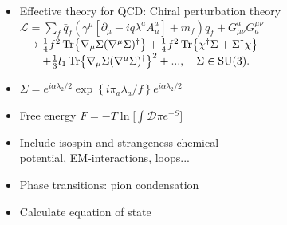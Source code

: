 \documentclass[aspectratio=169]{beamer}
\begin{document}
\begin{frame}
        \begin{itemize}
            \itemsep 0.4cm
            \item Effective theory for QCD: Chiral perturbation theory\\
            $
            \mathcal L = 
            \sum_f \bar q_f (\gamma^\mu [\partial_\mu - i q     \lambda^a A^a_\mu ] + m_f)q_f
            + G^a_{\mu \nu} G_a^{\mu \nu}
            $ \\
            $
            \longrightarrow
            \frac{1}{4} f^2 \Tr{\nabla_\mu \Sigma (\nabla^\mu \Sigma)^\dagger}
            + \frac{1}{4} f^2 \Tr{\chi^\dagger \Sigma + \Sigma^\dagger \chi} 
            $\\
            $
            \quad\quad + \frac{1}{3} l_1 \Tr{\nabla_\mu \Sigma (\nabla^\mu \Sigma)^\dagger}^2+
            ..., \quad
            \Sigma \in \text{SU}(3).
            $
            \item $\Sigma 
            = e^{i\alpha \lambda_2/2}\exp\left\{i \pi_a \lambda_a / f\right\}e^{i\alpha \lambda_2/2}
            $
            \item Free energy
            $
            F = - T
            \ln\Big[\int \mathcal{D}\pi e^{-S}\Big]
            $
            \item Include isospin and strangeness chemical \\
            potential, EM-interactions, loops...
            \item Phase transitions: pion condensation
            \item Calculate equation of state
        \end{itemize}


    \end{frame}
\end{document}
